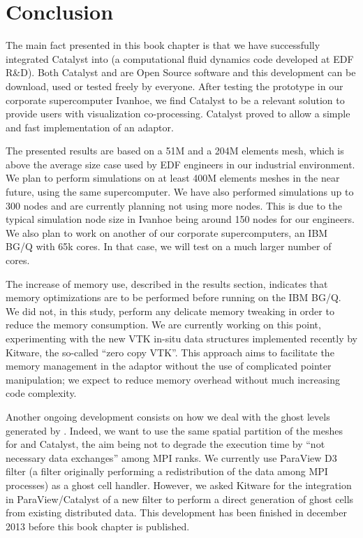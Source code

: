 \section{Conclusion}
\label{sec:conclusion}

The main fact presented in this book chapter is that we have successfully
integrated Catalyst into \CS (a computational fluid dynamics code
developed at EDF R\&D). Both Catalyst and \CS are Open Source software
and this development can be download, used or tested freely by everyone. After
testing the prototype in our corporate supercomputer Ivanhoe, we find Catalyst to
be a relevant solution to provide \CS users with visualization
co-processing. Catalyst proved to allow a simple and fast implementation of an
adaptor.

The presented results are based on a 51M and a 204M elements mesh, which is
above the average size case used by EDF engineers in our industrial environment.
We plan to perform simulations on at least 400M elements meshes in the near
future, using the same supercomputer. We have also performed simulations up to
300 nodes and are currently planning not using more nodes. This is due to the
typical simulation node size in Ivanhoe being around 150 nodes for our
engineers. We also plan to work on another of our corporate supercomputers, an
IBM BG/Q with 65k cores. In that case, we will test on a much larger number of
cores.

The increase of memory use, described in the results section, indicates that
memory optimizations are to be performed before running on the IBM BG/Q. We did
not, in this study, perform any delicate memory tweaking in order to reduce the
memory consumption. We are currently working on this point, experimenting with
the new VTK in-situ data structures implemented recently by Kitware, the
so-called ``zero copy VTK''. This approach aims to facilitate the memory
management in the adaptor without the use of complicated pointer manipulation;
we expect to reduce memory overhead without much increasing code complexity.

Another ongoing development consists on how we deal with the ghost levels
generated by \CS. Indeed, we want to use the same spatial partition of
the meshes for \CS and Catalyst, the aim being not to degrade the
execution time by “not necessary data exchanges” among MPI ranks. We currently
use ParaView D3 filter (a filter originally performing a redistribution of the
data among MPI processes) as a ghost cell handler. However, we asked Kitware for
the integration in ParaView/Catalyst of a new filter to perform a direct
generation of ghost cells from existing distributed data. This development has
been finished in december 2013 before this book chapter is published.

